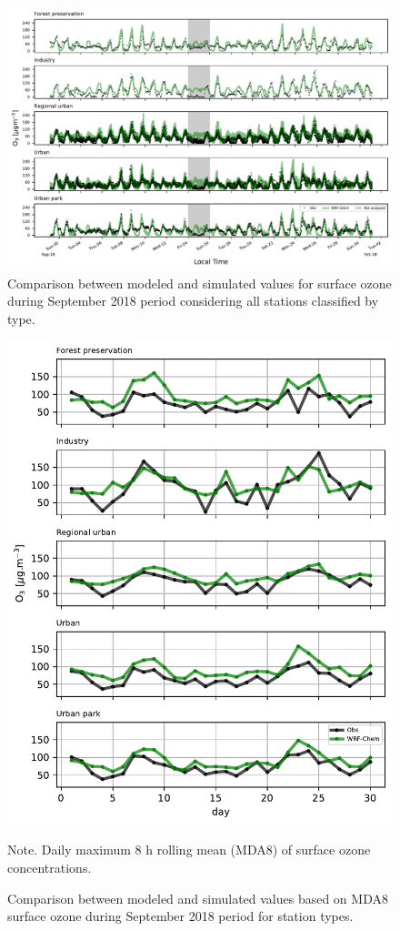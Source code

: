\begin{figure}[ht]
  \includegraphics[width=1\textwidth]{fig/Sep18_type_subplot_o3.pdf}
  \caption{Comparison between modeled and simulated values for surface ozone during September 2018 period considering all stations classified by type.}
  \label{fig:Sep18_type_o3}
\end{figure}

\begin{figure}[!hb]
  \begin{center}
    \includegraphics[width=.7\textwidth]{fig/MDA8_type.pdf}
  \end{center}
  \caption{Comparison between modeled and simulated values based on MDA8 surface ozone during September 2018 period for station types.}
  {\scriptsize Note. Daily maximum 8 h rolling mean (MDA8) of surface ozone concentrations.}
  \label{fig: MDA8_type_current}
\end{figure}

